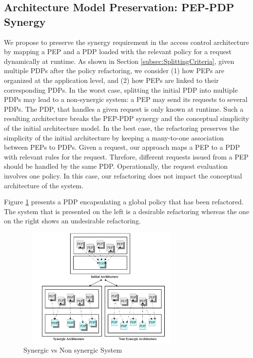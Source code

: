 \subsection{Architecture Model Preservation: PEP-PDP Synergy}

We propose to preserve the synergy requirement in the access control architecture by mapping a PEP and a PDP loaded
with the relevant policy for a request dynamically at runtime. As shown in Section \ref{subsec:SplittingCriteria}, given multiple PDPs after the policy refactoring, we consider 
(1) how PEPs are organized at the application level, and (2) how PEPs are linked to their corresponding PDPs.
In the worst case, splitting the initial PDP into multiple PDPs may lead to a non-synergic system: a PEP may send its requests to several PDPs. 
The PDP, that handles a given request is only known at runtime. Such a resulting architecture breaks the PEP-PDP synergy and the conceptual 
simplicity of the initial architecture model. 
In the best case, the refactoring preserves the simplicity of the initial architecture by keeping a many-to-one association 
between PEPs to PDPs. Given a request, our approach maps a PEP to a PDP with relevant rules for the request.
Threfore, different requests issued from a PEP should be handled by the same PDP. Operationally, the request evaluation involves 
one policy. In this case, our refactoring does not impact the conceptual architecture of the system.

Figure \ref{Synergicvsnonsynergicarchitecture} presents a PDP encapsulating a global policy that has been refactored. The system that is 
presented on the left is a desirable refactoring whereas the one on the right shows an undesirable refactoring.
\begin{figure}[!h]
\begin{center}
\includegraphics[width=8.5cm, height=6cm]{synergic-nonsynergic}
\caption{Synergic vs Non synergic System}
\label{Synergicvsnonsynergicarchitecture}
\end{center}
\end{figure}

